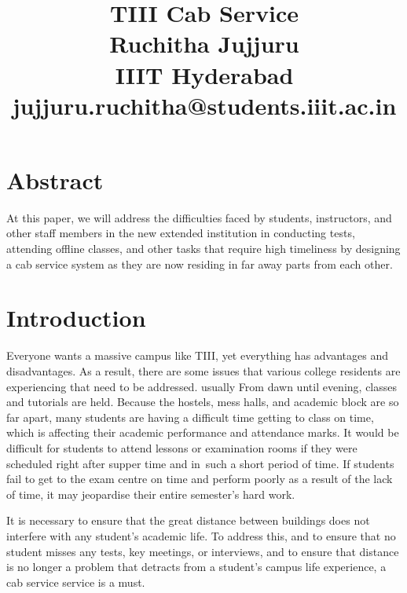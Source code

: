 \documentclass[conference]{IEEEtran}
\begin{document}
\title{TIII Cab Service\\
{\fontsize{15}{6}\selectfont Ruchitha Jujjuru}\\
{\fontsize{15}{6}\selectfont IIIT Hyderabad}\\
{\fontsize{15}{6}\selectfont jujjuru.ruchitha@students.iiit.ac.in}\\
}

\author{}

\maketitle





\section{Abstract}
At this paper, we will address the difficulties faced by students, instructors, and other staff members in the new extended institution in conducting tests, attending offline classes, and other tasks that require high timeliness by designing a cab service system as they are now residing in far away parts from each other.


\section{Introduction}
Everyone wants a massive campus like TIII, yet everything has advantages and disadvantages. As a result, there are some issues that various college residents are experiencing that need to be addressed. usually From dawn until evening, classes and tutorials are held. Because the hostels, mess halls, and academic block are so far apart, many students are having a difficult time getting to class on time, which is affecting their academic performance and attendance marks. It would be difficult for students to attend lessons or examination rooms if they were scheduled right after supper time and in such a short period of time. If students fail to get to the exam centre on time and perform poorly as a result of the lack of time, it may jeopardise their entire semester's hard work.\par
It is necessary to ensure that the great distance between buildings does not interfere with any student's academic life.
To address this, and to ensure that no student misses any tests, key meetings, or interviews, and to ensure that distance is no longer a problem that detracts from a student's campus life experience, a  cab service service is a must.\par
\end{document}
